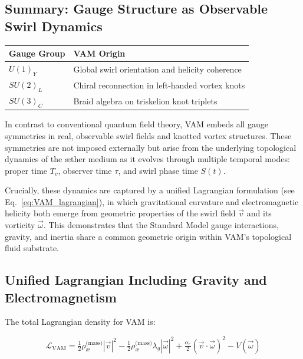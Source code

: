 \documentclass[preprint]{revtex4-2}
\begin{document}
    \subsection{Summary: Gauge Structure as Observable Swirl Dynamics}

    \begin{center}
    \begin{tabular}{ll}
    \toprule
    \textbf{Gauge Group} & \textbf{VAM Origin} \\
    \midrule
    \( U(1)_Y \) & Global swirl orientation and helicity coherence \\
    \( SU(2)_L \) & Chiral reconnection in left-handed vortex knots \\
    \( SU(3)_C \) & Braid algebra on triskelion knot triplets \\
    \bottomrule
    \end{tabular}
    \end{center}

     In contrast to conventional quantum field theory, VAM embeds all gauge symmetries in real, observable swirl fields and knotted vortex structures. These symmetries are not imposed externally but arise from the underlying topological dynamics of the æther medium as it evolves through multiple temporal modes: proper time \( T_v \), observer time \( \tau \), and swirl phase time \( S(t) \).

    Crucially, these dynamics are captured by a unified Lagrangian formulation (see Eq.~\eqref{eq:VAM_lagrangian}), in which gravitational curvature and electromagnetic helicity both emerge from geometric properties of the swirl field \( \vec{v} \) and its vorticity \( \vec{\omega} \). This demonstrates that the Standard Model gauge interactions, gravity, and inertia share a common geometric origin within VAM's topological fluid substrate.

      \subsection*{Unified Lagrangian Including Gravity and Electromagnetism}

        The total Lagrangian density for VAM is:

        \begin{equation}
        \mathcal{L}_{\text{VAM}} = \tfrac{1}{2} \rho_{\text{\ae}}^{\text{(mass)}} |\vec{v}|^2 - \tfrac{1}{2} \rho_{\text{\ae}}^{\text{(mass)}} \lambda_g |\vec{\omega}|^2 + \tfrac{\alpha_e}{2} (\vec{v} \cdot \vec{\omega})^2 - V(\vec{\omega})
        \label{eq:VAM_lagrangian}
        \end{equation}
\end{document}
